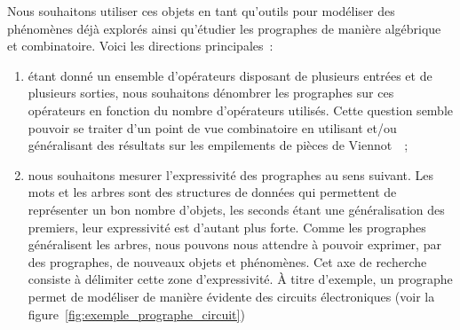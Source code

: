 \documentclass[10pt,reqno]{amsart}
\numberwithin{equation}{subsection}
\begin{document}
Nous souhaitons utiliser ces objets en tant qu'outils pour 
modéliser des phénomènes déjà explorés ainsi qu'étudier les prographes 
de manière algébrique et combinatoire. Voici les directions principales~:
\begin{enumerate}[fullwidth,label={\bf (\arabic*)}]
    \item \label{item:objectif_denombrement}
    étant donné un ensemble d'opérateurs disposant de plusieurs entrées 
    et de plusieurs sorties, nous souhaitons dénombrer les prographes 
    sur ces opérateurs en fonction du nombre d'opérateurs utilisés. Cette
    question semble pouvoir se traiter d'un point de vue combinatoire en 
    utilisant et/ou généralisant des résultats sur les empilements de 
    pièces de Viennot~\cite{Vie86}~;
    
    \item \label{item:objectif_modelisation}
    nous souhaitons mesurer l'expressivité des prographes au sens 
    suivant. Les mots et les arbres sont des structures de données qui 
    permettent de représenter un bon nombre d'objets, les seconds étant
    une généralisation des premiers, leur expressivité est d'autant plus
    forte. Comme les prographes généralisent les arbres, nous pouvons
    nous attendre à pouvoir exprimer, par des prographes, de nouveaux
    objets et phénomènes. Cet axe de recherche consiste à délimiter cette 
    zone d'expressivité. À titre d'exemple, un prographe permet de 
    modéliser de manière évidente des circuits électroniques (voir 
    la figure~\ref{fig:exemple_prographe_circuit})
    \begin{figure}[ht]
        \centering
\end{figure}
\end{enumerate}
\end{document}
